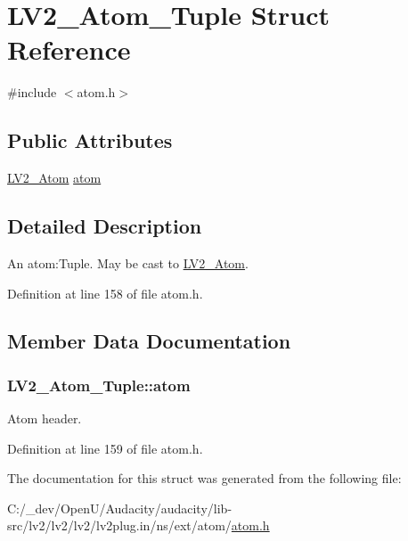 \hypertarget{struct_l_v2___atom___tuple}{}\section{L\+V2\+\_\+\+Atom\+\_\+\+Tuple Struct Reference}
\label{struct_l_v2___atom___tuple}


{\ttfamily \#include $<$atom.\+h$>$}

\subsection*{Public Attributes}
\begin{DoxyCompactItemize}
\item 
\hyperlink{struct_l_v2___atom}{L\+V2\+\_\+\+Atom} \hyperlink{struct_l_v2___atom___tuple_a993d7796e8772bec94e6d021974d8748}{atom}
\end{DoxyCompactItemize}


\subsection{Detailed Description}
An atom\+:Tuple. May be cast to \hyperlink{struct_l_v2___atom}{L\+V2\+\_\+\+Atom}. 

Definition at line 158 of file atom.\+h.



\subsection{Member Data Documentation}
\subsubsection[{\texorpdfstring{atom}{atom}}]{ L\+V2\+\_\+\+Atom\+\_\+\+Tuple\+::atom}\hypertarget{struct_l_v2___atom___tuple_a993d7796e8772bec94e6d021974d8748}{}\label{struct_l_v2___atom___tuple_a993d7796e8772bec94e6d021974d8748}
Atom header. 

Definition at line 159 of file atom.\+h.



The documentation for this struct was generated from the following file\+:\begin{DoxyCompactItemize}
\item 
C\+:/\+\_\+dev/\+Open\+U/\+Audacity/audacity/lib-\/src/lv2/lv2/lv2/lv2plug.\+in/ns/ext/atom/\hyperlink{atom_8h}{atom.\+h}\end{DoxyCompactItemize}

